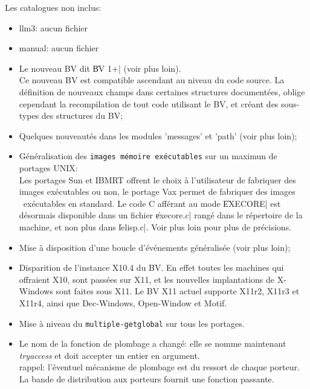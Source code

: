 Les catalogues non inclus:

\begin {itemize}
\item   llm3:   aucun fichier
\item   manual: aucun fichier
\end {itemize}


\begin {itemize}

\item Le nouveau BV dit \|BV 1+| (voir plus loin). \\
Ce nouveau BV est 
compatible ascendant au niveau du code source. La
d\'{e}finition de nouveaux champs dans certaines structures document\'{e}es,
oblige cependant la recompilation de tout code utilisant le BV, et cr\'{e}ant 
des sous-types des structures du BV;

\item Quelques nouveaut\'{e}s dans les modules 'messages' et 'path'
          (voir plus loin);

\item G\'{e}n\'{e}ralisation des {\tt images m\'{e}moire ex\'{e}cutables} 
sur un maximun de portages UNIX: \\
Les portages Sun et IBMRT offrent le choix \`{a} l'utilisateur 
de fabriquer des images ex\'{e}cutables ou non, le portage
Vax permet de fabriquer des images \LeLisp\ ex\'{e}cutables
en standard. Le code C aff\'{e}rant au mode \|EXECORE| est
d\'{e}sormais disponible dans un fichier \|execore.c|
rang\'{e} dans le r\'{e}pertoire de la machine, et non plus
dans \|lelisp.c|.
Voir plus loin pour plus de pr\'{e}cisions.

\item Mise \`{a} disposition d'une boucle d'\'{e}v\'{e}nements 
g\'{e}n\'{e}ralis\'{e}e (voir plus loin);

\item Disparition de l'instance X10.4 du BV. En effet toutes les
machines qui offraient X10, sont pass\'{e}es sur X11, et les nouvelles
implantations de X-Windows sont faites sous X11. Le BV X11 actuel supporte
X11r2, X11r3 et X11r4, ainsi que Dec-Windows, Open-Window et Motif.

\item Mise \`{a} niveau du {\tt multiple-getglobal} sur tous les portages.

\item Le nom de la fonction de plombage a chang\'{e}: elle se nomme
maintenant {\em tryaccess} et doit accepter un entier en argument. \\
rappel: l'\'{e}ventuel m\'{e}canisme de plombage est du ressort de chaque
porteur. La bande de distribution aux porteurs fournit une fonction
passante. 


\end{itemize}
